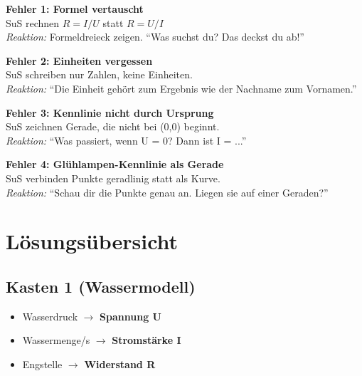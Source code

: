 \documentclass[11pt, a4paper]{article}
\begin{document}
\begin{warnbox}
\textbf{Fehler 1: Formel vertauscht}\\
SuS rechnen $R = I/U$ statt $R = U/I$\\
\textit{Reaktion:} Formeldreieck zeigen. "`Was suchst du? Das deckst du ab!"'
\end{warnbox}

\begin{warnbox}
\textbf{Fehler 2: Einheiten vergessen}\\
SuS schreiben nur Zahlen, keine Einheiten.\\
\textit{Reaktion:} "`Die Einheit gehört zum Ergebnis wie der Nachname zum Vornamen."'
\end{warnbox}

\begin{warnbox}
\textbf{Fehler 3: Kennlinie nicht durch Ursprung}\\
SuS zeichnen Gerade, die nicht bei (0,0) beginnt.\\
\textit{Reaktion:} "`Was passiert, wenn U = 0? Dann ist I = ..."'
\end{warnbox}

\begin{warnbox}
\textbf{Fehler 4: Glühlampen-Kennlinie als Gerade}\\
SuS verbinden Punkte geradlinig statt als Kurve.\\
\textit{Reaktion:} "`Schau dir die Punkte genau an. Liegen sie auf einer Geraden?"'
\end{warnbox}


\section*{Lösungsübersicht}

\subsection*{Kasten 1 (Wassermodell)}
\begin{itemize}[leftmargin=1.5em]
    \item Wasserdruck $\rightarrow$ \textbf{Spannung U}
    \item Wassermenge/s $\rightarrow$ \textbf{Stromstärke I}
    \item Engstelle $\rightarrow$ \textbf{Widerstand R}
\end{itemize}
\end{document}
